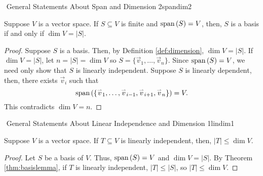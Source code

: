         \begin{theorem}{\Stop\,\,General Statements About Span and Dimension 2}{spandim2}
            
            Suppose \(V\) is a vector space. If \(S\subseteq V\) is finite and \(\text{span\,}(S)=V\), then, \(S\) is a basis if and only if \(\dim V = |S|\).
            \begin{proof}
                Suppose \(S\) is a basis. Then, by Definition \ref{def:dimension}, \(\dim V = |S|\). If \(\dim V = |S|\), let \(n=|S|=\dim V\) so \(S=\{\vec{v}_1,\ldots,\vec{v}_n\}\). Since \(\text{span\,}(S)=V\), we need only show that \(S\) is linearly independent. Suppose \(S\) is linearly dependent, then, there exists \(\vec{v}_i\) such that
                \begin{equation*}
                    \text{span\,}(\{\overset{_{\rightharpoonup}}{v}_1,\ldots,\overset{_{\rightharpoonup}}{v}_{i-1},\overset{_{\rightharpoonup}}{v}_{i+1},\overset{_{\rightharpoonup}}{v}_n\})=V.
                \end{equation*}
                This contradicts \(\dim V = n\). 
            \end{proof}

        \end{theorem}
        \pagebreak
        \begin{theorem}{\Stop\,\,General Statements About Linear Independence and Dimension 1}{lindim1}
            
            Suppose \(V\) is a vector space. If \(T\subseteq V\) is linearly independent, then, \(|T|\leq\dim V\).
            \begin{proof}
                Let \(S\) be a basis of \(V\). Thus, \(\text{span\,}(S)=V\) and \(\dim V=|S|\). By Theorem \ref{thm:basislemma}, if \(T\) is linearly independent, \(|T|\leq|S|\), so \(|T|\leq\dim V\).
            \end{proof}
        
        \end{theorem}
